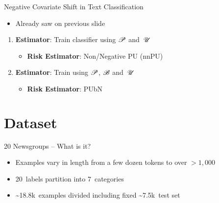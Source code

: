 \begin{frame}{Negative Covariate Shift in Text Classification}
  \onslide<+->{}
  \vfill
  \begin{itemize}[<+->]
    \item Already saw on previous slide
  \end{itemize}
  \vfill
  \begin{enumerate}[<+->][a]
    \setlength{\itemsep}{12pt}
    \item \textbf{ Estimator}: Train classifier using $\mathscr{P}$ and~$\mathscr{U}$~\cite{Fei:2015}
      \begin{itemize}
        \item \textbf{Risk Estimator}: Non\-/Negative PU (nnPU)~\cite{Kiryo:2017}
      \end{itemize}
    \item \textbf{ Estimator}: Train using $\mathscr{P}$, $\mathscr{B}$ and~$\mathscr{U}$
      \begin{itemize}
        \item \textbf{Risk Estimator}: PUbN~\cite{Hsieh:2018}
      \end{itemize}
  \end{enumerate}
\end{frame}

\section{Dataset}
\begin{frame}{20 Newsgroups -- What is it?}
  \begin{itemize}
    \item Examples vary in length from a few dozen tokens to over ${{>}1,000}$
    \item 20~labels partition into 7~categories 
  \end{itemize}
  \vfill
   
  \begin{itemize}[<+->]
    \item \textasciitilde18.8k~examples divided including fixed \textasciitilde7.5k~test set
  \end{itemize}
  \vfill
  {
    \begin{center}
      \scriptsize
      \onslide<+->{}
    \end{center}
  }
\end{frame}


